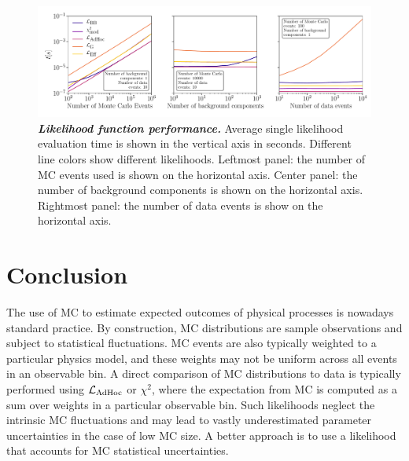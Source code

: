 \documentclass[a4paper, 11pt]{article}
\newcommand{\adhoc}{\mathcal{L}_{\textmd{AdHoc}}}
\begin{document}
\begin{figure}[ht]
\centering
    \includegraphics[width=1\linewidth]{fig/fig7_multi_panel}
\caption{\textbf{\textit{Likelihood function performance.}} Average single likelihood evaluation time is shown in the vertical axis in seconds. Different line colors show different likelihoods. Leftmost panel: the number of MC events used is shown on the horizontal axis. Center panel: the number of background components is shown on the horizontal axis. Rightmost panel: the number of data events is show on the horizontal axis.}
\label{fig:performance}
\end{figure}

\section{Conclusion\label{sec:conclusion}}

The use of MC to estimate expected outcomes of physical processes is nowadays standard practice. By construction, MC distributions are sample observations and subject to statistical fluctuations. MC events are also typically weighted to a particular physics model, and these weights may not be uniform across all events in an observable bin. 
A direct comparison of MC distributions to data is typically performed using $\adhoc$ or $\chi^2$, where the expectation from MC is computed as a sum over weights in a particular observable bin. Such likelihoods neglect the intrinsic MC fluctuations and may lead to vastly underestimated parameter uncertainties in the case of low MC size. A better approach is to use a likelihood that accounts for MC statistical uncertainties.
\end{document}
